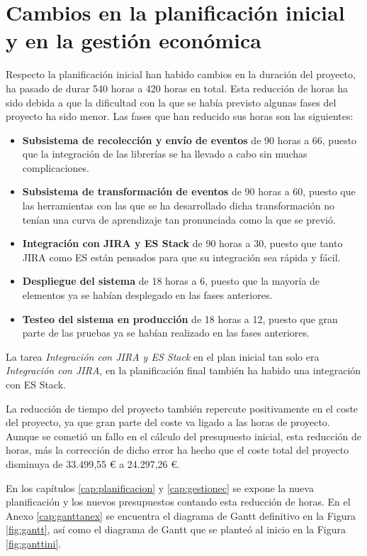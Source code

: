 \section{Cambios en la planificación inicial y en la gestión económica}

Respecto la planificación inicial han habido cambios en la duración del proyecto, ha pasado de durar 540 horas a 420 horas en total. Esta reducción de horas ha sido debida a que la dificultad con la que se había previsto algunas fases del proyecto ha sido menor. Las fases que han reducido sus horas son las siguientes:

\begin{itemize}
	\item \textbf{Subsistema de recolección y envío de eventos} de 90 horas a 66, puesto que la integración de las librerías se ha llevado a cabo sin muchas complicaciones.
	
	\item \textbf{Subsistema de transformación de eventos} de 90 horas a 60, puesto que las herramientas con las que se ha desarrollado dicha transformación no tenían una curva de aprendizaje tan pronunciada como la que se previó.
	
	\item \textbf{Integración con JIRA y ES Stack} de 90 horas a 30, puesto que tanto JIRA como ES están pensados para que su integración sea rápida y fácil.
	
	\item \textbf{Despliegue del sistema} de 18 horas a 6, puesto que la mayoría de elementos ya se habían desplegado en las fases anteriores.
	
	\item \textbf{Testeo del sistema en producción} de 18 horas a 12, puesto que gran parte de las pruebas ya se habían realizado en las fases anteriores.
\end{itemize}

La tarea \textit{Integración con JIRA y ES Stack} en el plan inicial tan solo era \textit{Integración con JIRA}, en la planificación final también ha habido una integración con ES Stack.

La reducción de tiempo del proyecto también repercute positivamente en el coste del proyecto, ya que gran parte del coste va ligado a las horas de proyecto. Aunque se cometió un fallo en el cálculo del presupuesto inicial, esta reducción de horas, más la corrección de dicho error ha hecho que el coste total del proyecto disminuya de 33.499,55 € a 24.297,26 €.

En los capítulos \ref{cap:planificacion} y \ref{cap:gestionec} se expone la nueva planificación y los nuevos presupuestos contando esta reducción de horas. En el Anexo \ref{cap:ganttanex} se encuentra el diagrama de Gantt definitivo en la Figura \ref{fig:gantt}, así como el diagrama de Gantt que se planteó al inicio en la Figura \ref{fig:ganttini}.
